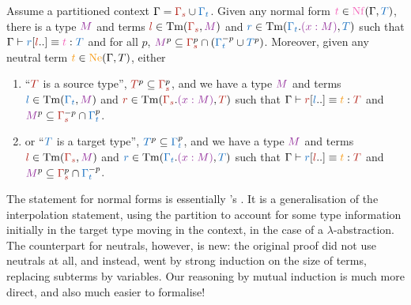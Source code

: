 \documentclass[a4paper,UKenglish,cleveref, autoref, thm-restate]{lipics-v2021}
\begin{document}
\begin{theorem}
    \label{thm:interpolation-ind}
  Assume a partitioned context \(\Gamma = \part{\Gamma_{s}}{\Gamma_{t}}\).
  Given any normal form \(\ccol{t} \in \Nf(\Gamma,\tcol{T})\),
  there is a type \(\mcol{M}\) and terms
  \(\scol{l} \in \Tm(\scol{\Gamma_{s}},\mcol{M})\) and
  \(\tcol{r} \in \Tm(\tcol{\Gamma_{t}}.\mcol{(x : M)}, \tcol{T})\)
  such that \(\conv{\Gamma}{\subs{\tcol{r}}{\scol{l}..}}{\ccol{t}}[\tcol{T}]\)
  and for all \(p\),
    \(\mcol{M}^p \subseteq \scol{\Gamma_{s}}^p \cap (\tcol{\Gamma_{t}}^{-p} \cup \tcol{T}^p)\).
  Moreover, given any neutral term \(\icol{t} \in \Ne(\Gamma,T)\), either
  \begin{enumerate}
    \item ``\(\scol{T}\) is a source type'', \ie \(\scol{T}^p \subseteq \scol{\Gamma_{s}}^p\),
      and we have a type \(\mcol{M}\) and terms \(\tcol{l} \in \Tm(\tcol{\Gamma_{t}},\mcol{M})\) and
  \(\scol{r} \in \Tm(\scol{\Gamma_{s}}.\mcol{(x : M)}, \scol{T})\) such that
  \(\conv{\Gamma}{\subs{\scol{r}}{\tcol{l}..}}{\icol{t}}[\scol{T}]\) and
  \(\mcol{M}^p \subseteq \scol{\Gamma_{s}}^{-p} \cap \tcol{\Gamma_{t}}^p\).

    \item or ``\(\tcol{T}\) is a target type'', \ie
      \(\tcol{T}^p \subseteq \tcol{\Gamma_{t}}^p\), and we have a type \(\mcol{M}\)
      and terms \(\scol{l} \in \Tm(\scol{\Gamma_{s}},\mcol{M})\) and
      \(\tcol{r} \in \Tm(\tcol{\Gamma_{t}}.\mcol{(x : M)}, \tcol{T})\) such that
       \(\conv{\Gamma}{\subs{\tcol{r}}{\scol{l}..}}{\icol{t}}[\scol{T}]\)
       and \(\mcol{M}^p \subseteq \scol{\Gamma_{s}}^p \cap \tcol{\Gamma_{t}}^{-p}\).
  \end{enumerate}
\end{theorem}

The statement for normal forms is essentially \Cubric's \cite[Lemma 3.7]{Cubric1994}.
It is a generalisation of
the interpolation statement, using the partition to account for some
type information initially in the target type moving in the context,
\eg in the case of a \(\lambda\)-abstraction.
The counterpart for neutrals, however, is new:
the original proof did not use neutrals at all, and instead, went by strong
induction on the size of terms, replacing subterms by variables.
Our reasoning by mutual induction is much more direct,
and also much easier to formalise!
\end{document}
